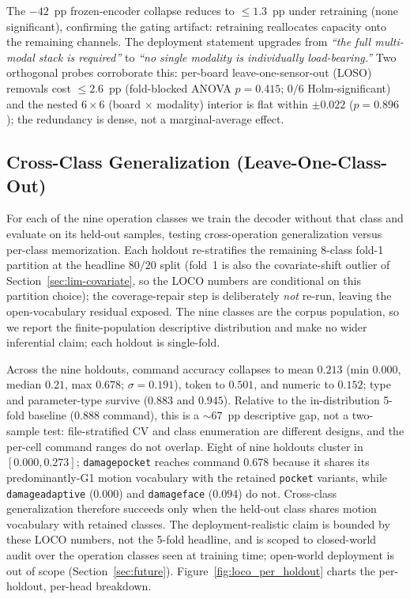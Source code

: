 \documentclass[conference]{IEEEtran}
\begin{document}
The $-42$~pp frozen-encoder collapse reduces to $\le\!1.3$~pp under retraining (none significant), confirming the gating artifact: retraining reallocates capacity onto the remaining channels. The deployment statement upgrades from \emph{``the full multi-modal stack is required''} to \emph{``no single modality is individually load-bearing.''} \label{sec:abl-lomo-sensor-stub}Two orthogonal probes corroborate this: per-board leave-one-sensor-out (LOSO) removals cost $\le\!2.6$~pp (fold-blocked ANOVA $p=0.415$; $0/6$ Holm-significant) and the nested $6\!\times\!6$ (board $\times$ modality) interior is flat within $\pm 0.022$ ($p=0.896$); the redundancy is dense, not a marginal-average effect.

\subsection{Cross-Class Generalization (Leave-One-Class-Out)}
\label{sec:loco}

For each of the nine operation classes we train the decoder without that class and evaluate on its held-out samples, testing cross-operation generalization versus per-class memorization. Each holdout re-stratifies the remaining $8$-class fold-1 partition at the headline $80/20$ split (fold~1 is also the covariate-shift outlier of Section~\ref{sec:lim-covariate}, so the LOCO numbers are conditional on this partition choice); the coverage-repair step is deliberately \emph{not} re-run, leaving the open-vocabulary residual exposed. The nine classes are the corpus population, so we report the finite-population descriptive distribution and make no wider inferential claim; each holdout is single-fold.

Across the nine holdouts, command accuracy collapses to mean $0.213$ (min $0.000$, median $0.21$, max $0.678$; $\sigma=0.191$), token to $0.501$, and numeric to $0.152$; type and parameter-type survive ($0.883$ and $0.945$). Relative to the in-distribution 5-fold baseline ($0.888$ command), this is a $\sim\!67$~pp descriptive gap, not a two-sample test: file-stratified CV and class enumeration are different designs, and the per-cell command ranges do not overlap. Eight of nine holdouts cluster in $[0.000, 0.273]$; \texttt{damagepocket} reaches command $0.678$ because it shares its predominantly-G1 motion vocabulary with the retained \texttt{pocket} variants, while \texttt{damageadaptive} ($0.000$) and \texttt{damageface} ($0.094$) do not. Cross-class generalization therefore succeeds only when the held-out class shares motion vocabulary with retained classes. The deployment-realistic claim is bounded by these LOCO numbers, not the 5-fold headline, and is scoped to closed-world audit over the operation classes seen at training time; open-world deployment is out of scope (Section~\ref{sec:future}). Figure~\ref{fig:loco_per_holdout} charts the per-holdout, per-head breakdown.
\end{document}
